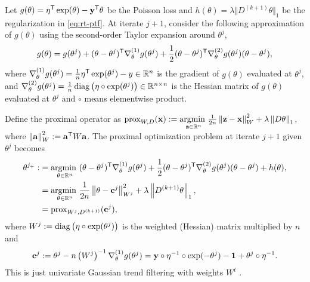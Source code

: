 Let $g(\theta)= \eta^{\mathsf{T}} \exp(\theta)-\mathbf{y}^{\mathsf{T}} \theta$ be the Poisson loss and
$h(\theta) = \lambda \Vert D^{(k+1)} \theta\Vert_1$ be the regularization in
\eqref{eq:rt-ptf}. At iterate $j+1$, consider the following approximation of
$g(\theta)$ using the second-order Taylor expansion around $\theta^j$, 
$$g(\theta) = g(\theta^j) + (\theta - \theta^j)^{\mathsf{T}} \nabla^{(1)}_{\theta}
g(\theta^j) + \frac{1}{2} (\theta - \theta^j)^{\mathsf{T}} \nabla^{(2)}_{\theta}
g(\theta^j) (\theta - \theta^j), $$ where $\nabla^{(1)}_{\theta} g(\theta^j) =
\frac{1}{n} \eta^{\mathsf{T}} \exp(\theta^j) - y \in \mathbb{R}^n$ is the gradient of $g(\theta)$
evaluated at $\theta^j$, and $\nabla^{(2)}_{\theta} g(\theta^j) = \frac{1}{n}\operatorname*{diag}
\left(\eta \circ \exp(\theta^j)\right) \in \mathbb{R}^{n\times n}$ is the Hessian matrix of
$g(\theta)$ evaluated at $\theta^j$ and $\circ$ means elementwise product.

Define the proximal operator as $\mathrm{prox}_{W,D} (\mathbf{x}) :=
\underset{\mathbf{z}\in\mathbb{R}^n}{\operatorname*{argmin}\ } \frac{1}{2n} \left\lVert \mathbf{z}-\mathbf{x} \right\rVert_W^2 + \lambda \left\lVert D\theta \right\rVert_1$,
where $\left\lVert \mathbf{a} \right\rVert_{W}^2 := \mathbf{a}^{\mathsf{T}} {W} \mathbf{a}$. The
proximal optimization problem at iterate $j+1$ given $\theta^j$ becomes
\begin{equation} \label{eq:prox-gauss}
    \begin{split}
        \theta^{j_+} :&= \underset{\theta\in\mathbb{R}^n}{\operatorname*{argmin}\ } (\theta - \theta^j)^{\mathsf{T}} \nabla^{(1)}_{\theta} g(\theta^j) + \frac{1}{2} (\theta - \theta^j)^{\mathsf{T}} \nabla^{(2)}_{\theta} g(\theta^j) (\theta - \theta^j) + h(\theta), \\
        &= \underset{\theta\in\mathbb{R}^n}{\operatorname*{argmin}\ } \frac{1}{2n} \left\lVert \theta - \mathbf{c}^{j} \right\rVert_{W^j}^2 + \lambda \left\lVert D^{(k+1)}\theta \right\rVert_1, \\
        &= \mathrm{prox}_{W^j,D^{(k+1)}} (\mathbf{c}^{j}),
    \end{split}
\end{equation}
where $W^j := \operatorname*{diag} \left(\eta\circ\exp(\theta^j)\right)$ is the weighted (Hessian)
matrix multiplied by $n$ and $$\mathbf{c}^j := \theta^j - n \left(W^{j}\right)^{-1}
\nabla^{(1)}_{\theta} g(\theta^j) = \mathbf{y} \circ \eta^{-1} \circ \exp(-\theta^j) -
\boldsymbol{1} + \theta^j \circ \eta^{-1}.$$
This is just univariate Gaussian trend filtering with weights $W^t$ \citep{tibshirani2014adaptive}. 

